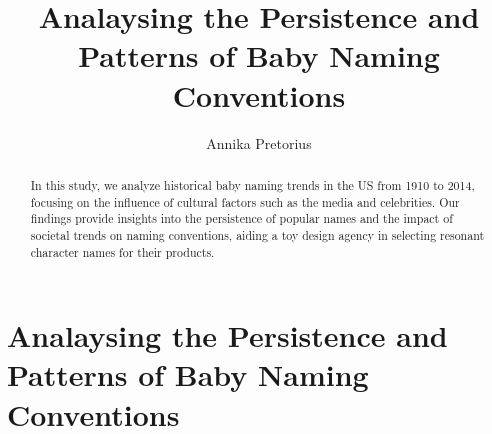 \documentclass[11pt,preprint, authoryear]{elsarticle}
\numberwithin{equation}{section}
\numberwithin{figure}{section}
\numberwithin{table}{section}
\begin{document}
\begin{frontmatter}  %

\title{Analaysing the Persistence and Patterns of Baby Naming
Conventions}





\author[Add1]{Annika Pretorius}
\ead{}





\address[Add1]{Stellenbosch University}


\begin{abstract}
\small{
In this study, we analyze historical baby naming trends in the US from
1910 to 2014, focusing on the influence of cultural factors such as the
media and celebrities. Our findings provide insights into the
persistence of popular names and the impact of societal trends on naming
conventions, aiding a toy design agency in selecting resonant character
names for their products.
}
\end{abstract}

\vspace{1cm}





\vspace{0.5cm}

\end{frontmatter}

\setcounter{footnote}{0}



\pagestyle{fancy}
\chead{}
\rhead{}
\lfoot{}
\lhead{}
\cfoot{}


\headsep 35pt %




\newpage

\hypertarget{analaysing-the-persistence-and-patterns-of-baby-naming-conventions}{%
\section{Analaysing the Persistence and Patterns of Baby Naming
Conventions}\label{analaysing-the-persistence-and-patterns-of-baby-naming-conventions}}
\end{document}
